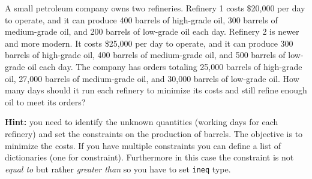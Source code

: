 \begin{Exercise}[title={(Minimization in Business)}]
A small petroleum company owns two refineries. Refinery 1 costs \$20,000 per day to
operate, and it can produce 400 barrels of high-grade oil, 300 barrels of medium-grade oil,
and 200 barrels of low-grade oil each day. Refinery 2 is newer and more modern. It costs
\$25,000 per day to operate, and it can produce 300 barrels of high-grade oil, 400 barrels of
medium-grade oil, and 500 barrels of low-grade oil each day.
The company has orders totaling 25,000 barrels of high-grade oil, 27,000 barrels of
medium-grade oil, and 30,000 barrels of low-grade oil. How many days should it run each
refinery to minimize its costs and still refine enough oil to meet its orders?

\textbf{Hint:} you need to identify the unknown quantities (working days for each refinery) and set the constraints on the production of barrels.
The objective is to minimize the costs. If you have multiple constraints you can define a list of dictionaries (one for constraint). Furthermore
in this case the constraint is not \emph{equal to} but rather \emph{greater than} so you have to set \texttt{ineq} type.
\end{Exercise}

